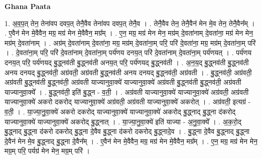 \documentclass[17pt]{extarticle}
\begin{document}
\textbf{Ghana Paata } \newline

1. अ॒व॒प॒त् तेन॒ तेना॑वप दवप॒त् तेनै॒वैव तेना॑वप दवप॒त् तेनै॒व । . तेनै॒वैव तेन॒ तेनै॒वैन॑ मेन मे॒व तेन॒ तेनै॒वैन᳚म् । . ए॒वैन॑ मेन मे॒वैवैन॒ मग्र॒ मग्र॑ मेन मे॒वैवैन॒ मग्र᳚म् । . ए॒न॒ मग्र॒ मग्र॑ मेन मेन॒ मग्र॑म् दे॒वता॑नाम् दे॒वता॑ना॒ मग्र॑ मेन मेन॒ मग्र॑म् दे॒वता॑नाम् । . अग्र॑म् दे॒वता॑नाम् दे॒वता॑ना॒ मग्र॒ मग्र॑म् दे॒वता॑ना॒म् परि॒ परि॑ दे॒वता॑ना॒ मग्र॒ मग्र॑म् दे॒वता॑ना॒म् परि॑ । . दे॒वता॑ना॒म् परि॒ परि॑ दे॒वता॑नाम् दे॒वता॑ना॒म् पर्य॑णय दनय॒त् परि॑ दे॒वता॑नाम् दे॒वता॑ना॒म् पर्य॑णयत् । . पर्य॑णय दनय॒त् परि॒ पर्य॑णयद् बु॒द्ध्नव॑ती बु॒द्ध्नव॑ती अनय॒त् परि॒ पर्य॑णयद् बु॒द्ध्नव॑ती । . अ॒न॒य॒द् बु॒द्ध्नव॑ती बु॒द्ध्नव॑ती अनय दनयद् बु॒द्ध्नव॑ती॒ अग्र॑वती॒ अग्र॑वती बु॒द्ध्नव॑ती अनय दनयद् बु॒द्ध्नव॑ती॒ अग्र॑वती । . बु॒द्ध्नव॑ती॒ अग्र॑वती॒ अग्र॑वती बु॒द्ध्नव॑ती बु॒द्ध्नव॑ती॒ अग्र॑वती याज्यानुवा॒क्ये॑ याज्यानुवा॒क्ये॑ अग्र॑वती बु॒द्ध्नव॑ती बु॒द्ध्नव॑ती॒ अग्र॑वती याज्यानुवा॒क्ये᳚ । . बु॒द्ध्नव॑ती॒ इति॑ बु॒द्ध्न - व॒ती॒ । . अग्र॑वती याज्यानुवा॒क्ये॑ याज्यानुवा॒क्ये॑ अग्र॑वती॒ अग्र॑वती याज्यानुवा॒क्ये॑ अकरो दकरोद् याज्यानुवा॒क्ये॑ अग्र॑वती॒ अग्र॑वती याज्यानुवा॒क्ये॑ अकरोत् । . अग्र॑वती॒ इत्यग्र॑ - व॒ती॒ । . या॒ज्या॒नु॒वा॒क्ये॑ अकरो दकरोद् याज्यानुवा॒क्ये॑ याज्यानुवा॒क्ये॑ अकरोद् बु॒द्ध्नाद् बु॒द्ध्ना द॑करोद् याज्यानुवा॒क्ये॑ याज्यानुवा॒क्ये॑ अकरोद् बु॒द्ध्नात् । . या॒ज्या॒नु॒वा॒क्ये॑ इति॑ याज्या - अ॒नु॒वा॒क्ये᳚ । . अ॒क॒रो॒द् बु॒द्ध्नाद् बु॒द्ध्ना द॑करो दकरोद् बु॒द्ध्ना दे॒वैव बु॒द्ध्ना द॑करो दकरोद् बु॒द्ध्नादे॒व । . बु॒द्ध्ना दे॒वैव बु॒द्ध्नाद् बु॒द्ध्ना दे॒वैन॑ मेन मे॒व बु॒द्ध्नाद् बु॒द्ध्ना दे॒वैन᳚म् । . ए॒वैन॑ मेन मे॒वैवैन॒ मग्र॒ मग्र॑ मेन मे॒वैवैन॒ मग्र᳚म् । . ए॒न॒ मग्र॒ मग्र॑ मेन मेन॒ मग्र॒म् परि॒ पर्यग्र॑ मेन मेन॒ मग्र॒म् परि॑ । \newline
\end{document}
